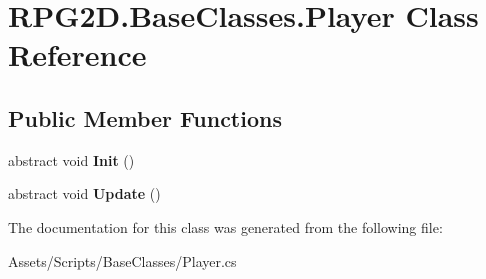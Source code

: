 \hypertarget{class_r_p_g2_d_1_1_base_classes_1_1_player}{}\section{R\+P\+G2\+D.\+Base\+Classes.\+Player Class Reference}
\label{class_r_p_g2_d_1_1_base_classes_1_1_player}
\subsection*{Public Member Functions}
\begin{DoxyCompactItemize}
\item 
\mbox{\label{class_r_p_g2_d_1_1_base_classes_1_1_player_a0bd1dc7ef5303d8322688335edbd3212}} 
abstract void {\bfseries Init} ()
\item 
\mbox{\label{class_r_p_g2_d_1_1_base_classes_1_1_player_a6334abdf0f7f90b3a4c03f1c379c5fc7}} 
abstract void {\bfseries Update} ()
\end{DoxyCompactItemize}


The documentation for this class was generated from the following file\+:\begin{DoxyCompactItemize}
\item 
Assets/\+Scripts/\+Base\+Classes/Player.\+cs\end{DoxyCompactItemize}
